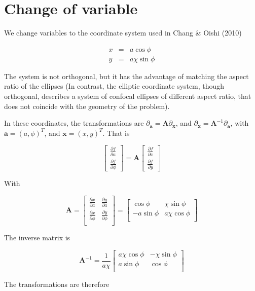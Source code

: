 \documentclass[useAMS,8pt,twocolumn]{article}
\newcommand{\pderiv}[2]{\frac{\partial #1}{\partial #2}}
\newcommand{\vt}[1]{\mathbf{#1}}       %
\renewcommand{\v}[1]{{\boldsymbol{#1}}} %
\newcommand{\beq}{\begin{equation}}
\newcommand{\eeq}{\end{equation}}
\newcommand{\beqn}{\begin{eqnarray}}
\newcommand{\eeqn}{\end{eqnarray}}
\begin{document}
\section{Change of variable}

We change variables to the coordinate system used in Chang \& Oishi (2010)

\beqn
  x &=& a \cos\phi \\
  y &=& a\chi\sin\phi
\eeqn

The system is not orthogonal, but it has the advantage of matching the
aspect ratio of the ellipses (In contrast, the elliptic coordinate
system, though orthogonal, describes a system of confocal ellipses of
different aspect ratio, that does not coincide with the geometry of
the problem). 

In these coordinates, the transformations are $\partial_\v{a} =
\vt{A} \partial_\v{x}$, and $\partial_\v{x} =
\vt{A}^{-1} \partial_\v{a}$, with $\v{a} = (a,\phi)^T$, and $\v{x} =
(x,y)^T$. That is

\beq
\left[\begin{array}{c}
    \pderiv{f}{a}  \\
    \pderiv{f}{\phi}
  \end{array}\right] = \vt{A} 
  \left[\begin{array}{c}
      \pderiv{f}{x}  \\
      \pderiv{f}{y}
    \end{array}\right] 
\eeq

With 

\beq
\vt{A} = \left[\begin{array}{cc}
\pderiv{x}{a}  & \pderiv{y}{a}  \\
\pderiv{x}{\phi}  & \pderiv{y}{\phi} \\
\end{array}\right] = \left[\begin{array}{cc}
\cos\phi  & \chi\sin\phi  \\
-a\sin\phi  & a\chi\cos\phi \\
\end{array}\right] 
\eeq

The inverse matrix is 

\beq
\vt{A}^{-1} = \frac{1}{a\chi} \left[\begin{array}{cc}
a\chi\cos\phi  & -\chi\sin\phi  \\
a\sin\phi  & \cos\phi \\
\end{array}\right]  
\eeq

The transformations are therefore
\end{document}
